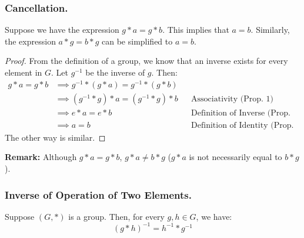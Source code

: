 \documentclass[letterpaper]{article}
\begin{document}
\subsubsection{Cancellation.}
Suppose we have the expression $g * a = g * b$. This implies that $a = b$. Similarly, the expression $a * g = b * g$ can be simplified to $a = b$. 

\begin{mdframed}
    \begin{proof}
        From the definition of a group, we know that an inverse exists for every element in $G$. Let $g^{-1}$ be the inverse of $g$. Then:
        \begin{equation*}
            \begin{aligned}
                g * a = g * b &\implies g^{-1} * (g * a) = g^{-1} * (g * b) \\
                    &\implies (g^{-1} * g) * a = (g^{-1} * g) * b && \text{Associativity (Prop. 1)} \\
                    &\implies e * a = e * b && \text{Definition of Inverse (Prop. 3)} \\  
                    &\implies a = b && \text{Definition of Identity (Prop. 2)}
            \end{aligned}
        \end{equation*}
        The other way is similar. 
    \end{proof}
\end{mdframed}

\textbf{Remark:} Although $g * a = g * b$, $g * a \neq b * g$ ($g * a$ is not necessarily equal to $b * g$). 

\subsubsection{Inverse of Operation of Two Elements.}

\begin{lemma}{}{}
    Suppose $(G, *)$ is a group. Then, for every $g, h \in G$, we have: 
    \[(g * h)^{-1} = h^{-1} * g^{-1}\]
\end{lemma}
\end{document}
